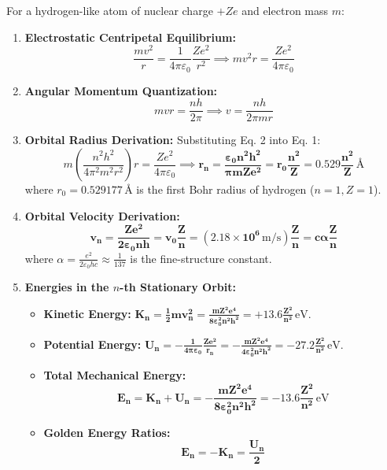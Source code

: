 \documentclass[10pt,twoside,openright]{book}
\begin{document}
\begin{formulabox}
For a hydrogen-like atom of nuclear charge $+Ze$ and electron mass $m$:
\begin{enumerate}
  \item \textbf{Electrostatic Centripetal Equilibrium:}
  \begin{equation}
    \frac{m v^2}{r} = \frac{1}{4\pi\varepsilon_0} \frac{Z e^2}{r^2} \implies m v^2 r = \frac{Z e^2}{4\pi\varepsilon_0} \tag{Eq. 1}
  \end{equation}
  \item \textbf{Angular Momentum Quantization:}
  \begin{equation}
    m v r = \frac{n h}{2\pi} \implies v = \frac{n h}{2\pi m r} \tag{Eq. 2}
  \end{equation}
  \item \textbf{Orbital Radius Derivation:} Substituting Eq. 2 into Eq. 1:
  \begin{equation}
    m \left(\frac{n^2 h^2}{4\pi^2 m^2 r^2}\right) r = \frac{Z e^2}{4\pi\varepsilon_0} \implies \mathbf{r_n = \frac{\varepsilon_0 n^2 h^2}{\pi m Z e^2} = r_0 \frac{n^2}{Z} = 0.529 \frac{n^2}{Z}\,\text{\AA}}
  \end{equation}
  where $r_0 = 0.529177\,\text{\AA}$ is the first Bohr radius of hydrogen ($n=1, Z=1$).
  \item \textbf{Orbital Velocity Derivation:}
  \begin{equation}
    \mathbf{v_n = \frac{Z e^2}{2\varepsilon_0 n h} = v_0 \frac{Z}{n} = \left(2.18 \times 10^6\,\mathrm{m/s}\right)\frac{Z}{n} = c \alpha \frac{Z}{n}}
  \end{equation}
  where $\alpha = \frac{e^2}{2\varepsilon_0 h c} \approx \frac{1}{137}$ is the fine-structure constant.
  \item \textbf{Energies in the $n$-th Stationary Orbit:}
  \begin{itemize}
    \item \textbf{Kinetic Energy:} $\mathbf{K_n = \frac{1}{2}m v_n^2 = \frac{m Z^2 e^4}{8\varepsilon_0^2 n^2 h^2} = +13.6 \frac{Z^2}{n^2}\,\mathrm{eV}}$.
    \item \textbf{Potential Energy:} $\mathbf{U_n = -\frac{1}{4\pi\varepsilon_0}\frac{Z e^2}{r_n} = -\frac{m Z^2 e^4}{4\varepsilon_0^2 n^2 h^2} = -27.2 \frac{Z^2}{n^2}\,\mathrm{eV}}$.
    \item \textbf{Total Mechanical Energy:}
    \begin{equation}
      \mathbf{E_n = K_n + U_n = -\frac{m Z^2 e^4}{8\varepsilon_0^2 n^2 h^2} = -13.6 \frac{Z^2}{n^2}\,\mathrm{eV}}
    \end{equation}
    \item \textbf{Golden Energy Ratios:}
    \begin{equation}
      \mathbf{E_n = -K_n = \frac{U_n}{2}}
    \end{equation}
  \end{itemize}
\end{enumerate}
\end{formulabox}
\end{document}
